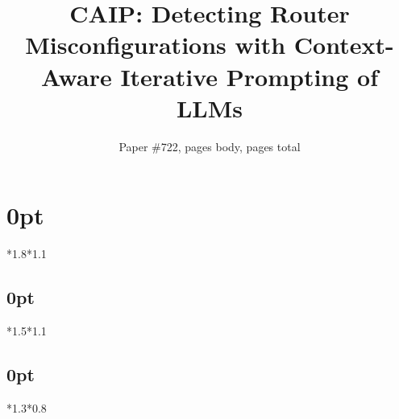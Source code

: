 \usepackage{caption}
\usepackage{ltablex}

\usepackage{ifluatex}

\usepackage{outlines}
\newtheorem{insight}{Insight}

\captionsetup[figure]{belowskip=0pt}
\captionsetup[figure]{skip=0pt}
\captionsetup[table]{belowskip=0pt}
\captionsetup[table]{skip=0pt}


\usepackage[compact]{titlesec}
\renewcommand{\paragraph}[1]{\noindent\textbf{#1}}
\setlength{\textfloatsep}{5pt plus 0pt minus 2.0pt}
\titlespacing\section{0pt}{*1.8}{*1.1}
\titlespacing\subsection{0pt}{*1.5}{*1.1}
\titlespacing\subsection{0pt}{*1.3}{*0.8}
\usepackage{booktabs}



\newcommand*{\affmark}[1][*]{\textsuperscript{#1}}
\newcommand*{\affaddr}[1]{#1}


\title{CAIP: Detecting Router Misconfigurations with Context-Aware Iterative Prompting of LLMs}
\author{Paper \#722, \pageref{endOfBody} pages body, \pageref{LastPage} pages total}
\newcommand{\eg}{{\it e.g.}}
\newcommand{\ie}{{\it i.e.}}
\newcommand{\etal}{{\it et al.}}
\newcommand{\sysname}{{CAIP}}

\maketitle

